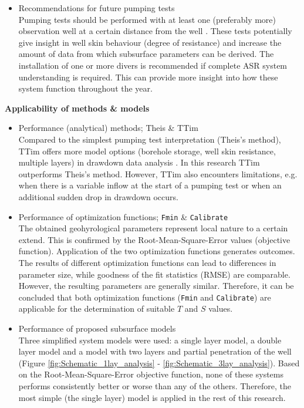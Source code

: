\begin{itemize}
\item{Recommendations for future pumping tests} \\
Pumping tests should be performed with at least one (preferably more) observation well at a certain distance from the well \citep{Kruseman2000}. These tests potentially give insight in well skin behaviour (degree of resistance) and increase the amount of data from which subsurface parameters can be derived. The installation of one or more divers is recommended if complete ASR system understanding is required. This can provide more insight into how these system function throughout the year.

\end{itemize}

\textbf{Applicability of methods \& models}
\begin{itemize}
\item{Performance (analytical) methods; Theis \& TTim} \\
Compared to the simplest pumping test interpretation (Theis's method), TTim offers more model options (borehole storage, well skin resistance, multiple layers) in drawdown data analysis \citep{Mishra2013,Bakker2013}. In this research TTim outperforms Theis's method. However, TTim also encounters limitations, e.g. when there is a variable inflow at the start of a pumping test or when an additional sudden drop in drawdown occurs. 

\item{Performance of optimization functions; \texttt{Fmin} \& \texttt{Calibrate}} \\
The obtained geohyrological parameters represent local nature to a certain extend. This is confirmed by the Root-Mean-Square-Error values (objective function). Application of the two optimization functions generates outcomes. The results of different optimization functions can lead to differences in parameter size, while goodness of the fit statistics (RMSE) are comparable. However, the resulting parameters are generally similar. Therefore, it can be concluded that both optimization functions (\texttt{Fmin} and \texttt{Calibrate}) are applicable for the determination of suitable $T$ and $S$ values. 

\item{Performance of proposed subsurface models}  \\
Three simplified system models were used: a single layer model, a double layer model and a model with two layers and partial penetration of the well (Figure \ref{fig:Schematic_1lay_analysis} - \ref{fig:Schematic_3lay_analysis}). Based on the Root-Mean-Square-Error objective function, none of these systems performs consistently better or worse than any of the others. Therefore, the most simple (the single layer) model is applied in the rest of this research.
\end{itemize}

